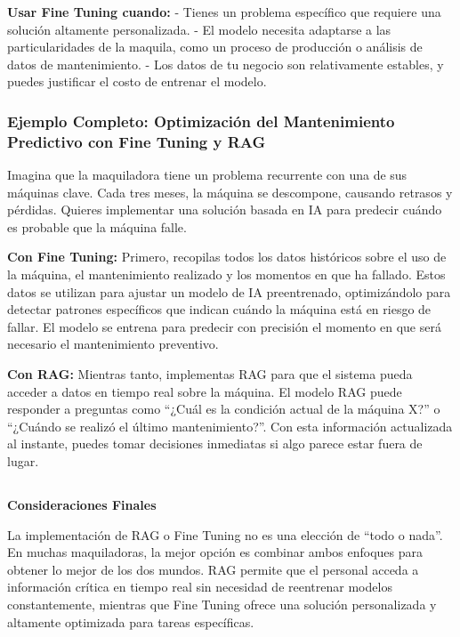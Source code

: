 \documentclass[
  10pt,
  letterpaper,
]{book}
\begin{document}
\textbf{Usar Fine Tuning cuando:} - Tienes un problema específico que
requiere una solución altamente personalizada. - El modelo necesita
adaptarse a las particularidades de la maquila, como un proceso de
producción o análisis de datos de mantenimiento. - Los datos de tu
negocio son relativamente estables, y puedes justificar el costo de
entrenar el modelo.

\subsubsection{\texorpdfstring{\textbf{Ejemplo Completo: Optimización
del Mantenimiento Predictivo con Fine Tuning y
RAG}}{Ejemplo Completo: Optimización del Mantenimiento Predictivo con Fine Tuning y RAG}}\label{ejemplo-completo-optimizaciuxf3n-del-mantenimiento-predictivo-con-fine-tuning-y-rag}

Imagina que la maquiladora tiene un problema recurrente con una de sus
máquinas clave. Cada tres meses, la máquina se descompone, causando
retrasos y pérdidas. Quieres implementar una solución basada en IA para
predecir cuándo es probable que la máquina falle.

\textbf{Con Fine Tuning:} Primero, recopilas todos los datos históricos
sobre el uso de la máquina, el mantenimiento realizado y los momentos en
que ha fallado. Estos datos se utilizan para ajustar un modelo de IA
preentrenado, optimizándolo para detectar patrones específicos que
indican cuándo la máquina está en riesgo de fallar. El modelo se entrena
para predecir con precisión el momento en que será necesario el
mantenimiento preventivo.

\textbf{Con RAG:} Mientras tanto, implementas RAG para que el sistema
pueda acceder a datos en tiempo real sobre la máquina. El modelo RAG
puede responder a preguntas como ``¿Cuál es la condición actual de la
máquina X?'' o ``¿Cuándo se realizó el último mantenimiento?''. Con esta
información actualizada al instante, puedes tomar decisiones inmediatas
si algo parece estar fuera de lugar.

\subsection{}\label{section}

\textbf{Consideraciones Finales}

La implementación de RAG o Fine Tuning no es una elección de ``todo o
nada''. En muchas maquiladoras, la mejor opción es combinar ambos
enfoques para obtener lo mejor de los dos mundos. RAG permite que el
personal acceda a información crítica en tiempo real sin necesidad de
reentrenar modelos constantemente, mientras que Fine Tuning ofrece una
solución personalizada y altamente optimizada para tareas específicas.
\end{document}
